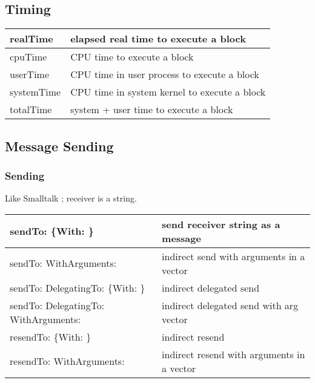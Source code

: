 \documentclass[letterpaper,10pt,english]{sphinxmanual}
\begin{document}
\subsection{Timing}
\label{\detokenize{usefulselectors:timing}}
\noindent\begin{tabulary}{\linewidth}{p{5cm} p{10cm}}
\hline

realTime
&
elapsed real time to execute a block
\\
\hline
cpuTime
&
CPU time to execute a block
\\
\hline
userTime
&
CPU time in user process to execute a block
\\
\hline
systemTime
&
CPU time in system kernel to execute a block
\\
\hline
totalTime
&
system + user time to execute a block
\\
\hline\end{tabulary}



\subsection{Message Sending}
\label{\detokenize{usefulselectors:message-sending}}

\subsubsection{Sending}
\label{\detokenize{usefulselectors:sending}}
Like Smalltalk ; receiver is a string.

\noindent\begin{tabulary}{\linewidth}{p{5cm} p{10cm}}
\hline

sendTo: \{With: \}
&
send receiver string as a message
\\
\hline
sendTo: WithArguments:
&
indirect send with arguments in a vector
\\
\hline
sendTo: DelegatingTo: \{With: \}
&
indirect delegated send
\\
\hline
sendTo: DelegatingTo: WithArguments:
&
indirect delegated send with arg vector
\\
\hline
resendTo: \{With: \}
&
indirect resend
\\
\hline
resendTo: WithArguments:
&
indirect resend with arguments in a vector
\\
\hline\end{tabulary}
\end{document}
